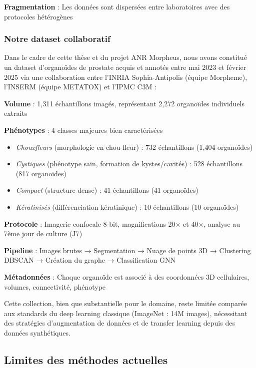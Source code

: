 \textbf{Fragmentation} : Les données sont dispersées entre laboratoires avec des protocoles hétérogènes


\subsubsection{Notre dataset collaboratif}

Dans le cadre de cette thèse et du projet ANR Morpheus, nous avons constitué un dataset d'organoïdes de prostate acquis et annotés entre mai 2023 et février 2025 via une collaboration entre l'INRIA Sophia-Antipolis (équipe Morpheme), l'INSERM (équipe METATOX) et l'IPMC C3M :

\textbf{Volume} : 1,311 échantillons imagés, représentant 2,272 organoïdes individuels extraits

\textbf{Phénotypes} : 4 classes majeures bien caractérisées
        \begin{itemize}
            \item \textit{Chouxfleurs} (morphologie en chou-fleur) : 732 échantillons (1,404 organoïdes)
            \item \textit{Cystiques} (phénotype sain, formation de kystes/cavités) : 528 échantillons (817 organoïdes)
            \item \textit{Compact} (structure dense) : 41 échantillons (41 organoïdes)
            \item \textit{Kératinisés} (différenciation kératinique) : 10 échantillons (10 organoïdes)
        \end{itemize}

\textbf{Protocole} : Imagerie confocale 8-bit, magnifications 20× et 40×, analyse au 7ème jour de culture (J7)

\textbf{Pipeline} : Images brutes → Segmentation → Nuage de points 3D → Clustering DBSCAN → Création du graphe → Classification GNN

\textbf{Métadonnées} : Chaque organoïde est associé à des coordonnées 3D cellulaires, volumes, connectivité, phénotype

Cette collection, bien que substantielle pour le domaine, reste limitée comparée aux standards du deep learning classique (ImageNet : 14M images), nécessitant des stratégies d'augmentation de données et de transfer learning depuis des données synthétiques.

\subsection{Limites des méthodes actuelles}

